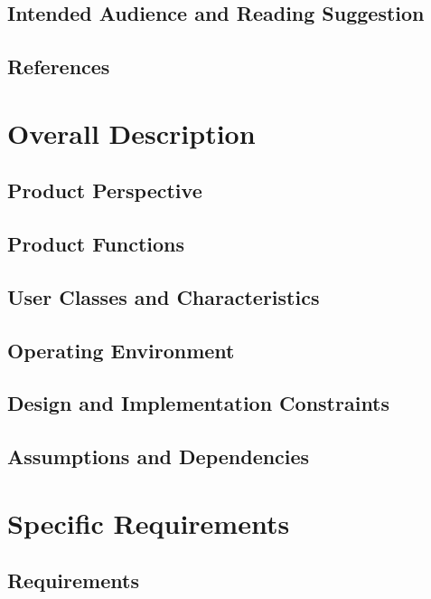 \documentclass{article}
\begin{document}
\subsection{Intended Audience and Reading Suggestion}

\subsection{References}


\newpage

\section{Overall Description}

\subsection{Product Perspective}

\subsection{Product Functions}

\subsection{User Classes and Characteristics}

\subsection{Operating Environment}

\subsection{Design and Implementation Constraints}

\subsection{Assumptions and Dependencies}

\newpage

\section{Specific Requirements}

\subsection{Requirements}
\end{document}

